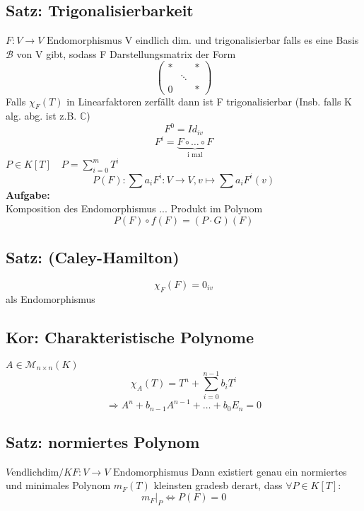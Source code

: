 \documentclass[titlepage,12pt,a4paper,ngerman]{report}
\newcommand{\tx}[1]{\textrm{#1}}
\newcommand{\enph}{F: V \to V \textrm{ Endomorphismus}}
\begin{document}

\subsection{Satz: Trigonalisierbarkeit}
$\enph$ V eindlich dim. und trigonalisierbar
falls es eine Basis $\mathcal{B}$ von V gibt, sodass F Darstellungsmatrix der Form
$$\begin{pmatrix}
* && * \\
& \ddots \\
0 && *
\end{pmatrix}$$
Falls $\chi_F(T)$ in Linearfaktoren zerfällt dann ist F trigonalisierbar (Insb. falls K alg. abg. ist z.B. $ \mathbb{C}$)
$$F^0 = Id_{iv}$$
$$ F^i = \underbrace{F \circ \dots \circ F}_{\tx{i mal}}$$
$P\in K[T] \quad P = \sum_{i=0}^mT^i$
$$P(F): \sum a_i F^i: V\to V, v \mapsto \sum a_i F^i(v)$$
\textbf{Aufgabe:}\\
Komposition des Endomorphismus ... Produkt im Polynom
$$P(F) \circ f(F) = (P \cdot G)(F)$$

\subsection{Satz: (Caley-Hamilton)}
$$\chi_F(F) = 0_{iv} $$
als Endomorphismus
\subsection{Kor: Charakteristische Polynome}
$A\in \mathcal{M}_{n\times n} (K)$
$$\chi_A(T) = T^n + \sum_{i=0}^{n-1} b_i T^i$$
$$\Rightarrow A^n + b_{n-1} A^{n-1} + \dots  + b_0 E_n = 0$$
\subsection{Satz: normiertes Polynom}
$ V \tx{endlichdim} / K \enph$
Dann existiert genau ein normiertes und minimales Polynom $m_F(T)$ kleinsten gradesb derart, dass $\forall P\in K[T]$:
$$ m_F|_P \Leftrightarrow P(F) = 0$$
\end{document}

